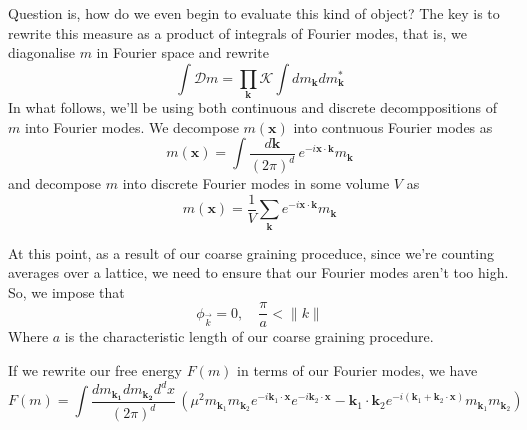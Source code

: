 \documentclass[11pt, oneside]{article}   	%
\begin{document}
Question is, how do we even begin to evaluate this kind of object? The key is to rewrite this measure as a product of integrals of Fourier modes, that is, we diagonalise $m$ in Fourier space and rewrite \[ \int \mathcal{D}m  = \prod_\mathbf{k} \mathcal{K} \int d m_\mathbf{ k } d m^*_\mathbf{k} \] 
In what follows, we'll be using both continuous and discrete decomppositions of $m$ into Fourier modes. We decompose $m( \mathbf{x} ) $ into contnuous Fourier modes as \[ m(\mathbf{x} ) = \int  \frac{d\mathbf{k}}{ ( 2 \pi )^d }\, e^{ - i \mathbf{x} \cdot \mathbf{k}}m_\mathbf{k} \] and decompose $m$ into discrete Fourier modes in some volume $V$ as \[ m(\mathbf{x} ) = \frac{1}{ V} \sum_\mathbf{k} e^{ - i \mathbf{x} \cdot \mathbf{k} }m_\mathbf{k} \] 

At this point, as a result of our coarse graining proceduce, since we're counting averages over a lattice, we need to ensure that our Fourier modes aren't too high. So, we impose that 
\[
 \phi_{\vec{k}} =0, \quad  \frac{\pi}{ a } < \| k \|  
\] Where $ a $ is the characteristic length of our coarse graining procedure. 

If we rewrite our free energy $F (m)$ in terms of our Fourier modes, we have \[ F(m) = \int \frac{d m_\mathbf{k_1} d m_\mathbf{k_2}d^d x}{( 2\pi )^d} \, \left( \mu^2 m_{\mathbf{k}_1} m_{\mathbf{k}_2} e^{ - i \mathbf{k}_1 \cdot \mathbf{x} } e^{ - i \mathbf{k}_2 \cdot \mathbf{x} } - \mathbf{k}_1 \cdot \mathbf{k}_2 e^{ - i ( \mathbf{k}_1 + \mathbf{k}_2  \cdot \mathbf{x} )}m_{\mathbf{k}_1} m_{\mathbf{k}_2} \right) \] 
\end{document}
